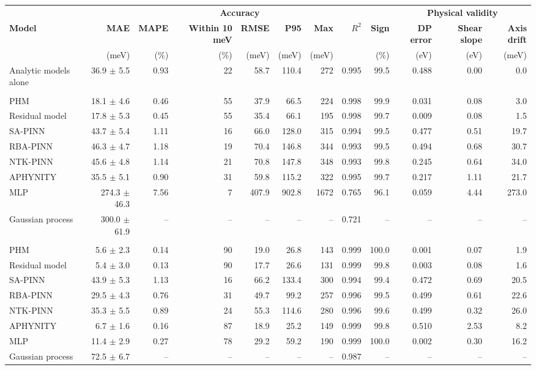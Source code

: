 \begin{tabular}{lrrrrrrrrrrr}
\toprule
 & \multicolumn{8}{c}{\textbf{Accuracy}} & \multicolumn{3}{c}{\textbf{Physical validity}} \\
\cmidrule(lr){2-9}\cmidrule(l){10-12}
\textbf{Model} & \textbf{MAE} & \textbf{MAPE} & \textbf{Within 10 meV} & \textbf{RMSE} & \textbf{P95} & \textbf{Max} & \textbf{$R^2$} & \textbf{Sign} & \textbf{DP error} & \textbf{Shear slope} & \textbf{Axis drift} \\
 & (meV) & (\%) & (\%) & (meV) & (meV) & (meV) & & (\%) & (eV) & (eV) & (meV) \\
\midrule
Analytic models alone & 36.9 $\pm$ 5.5 & 0.93 & 22 & 58.7 & 110.4 & 272 & 0.995 & 99.5 & 0.488 & 0.00 & 0.0 \\
\addlinespace
\multicolumn{12}{l}{\textit{5\% of the training states labeled (45 calculations)}} \\
PHM & 18.1 $\pm$ 4.6 & 0.46 & 55 & 37.9 & 66.5 & 224 & 0.998 & 99.9 & 0.031 & 0.08 & 3.0 \\
Residual model & 17.8 $\pm$ 5.3 & 0.45 & 55 & 35.4 & 66.1 & 195 & 0.998 & 99.7 & 0.009 & 0.08 & 1.5 \\
SA-PINN & 43.7 $\pm$ 5.4 & 1.11 & 16 & 66.0 & 128.0 & 315 & 0.994 & 99.5 & 0.477 & 0.51 & 19.7 \\
RBA-PINN & 46.3 $\pm$ 4.7 & 1.18 & 19 & 70.4 & 146.8 & 344 & 0.993 & 99.5 & 0.494 & 0.68 & 30.7 \\
NTK-PINN & 45.6 $\pm$ 4.8 & 1.14 & 21 & 70.8 & 147.8 & 348 & 0.993 & 99.8 & 0.245 & 0.64 & 34.0 \\
APHYNITY & 35.5 $\pm$ 5.1 & 0.90 & 31 & 59.8 & 115.2 & 322 & 0.995 & 99.7 & 0.217 & 1.11 & 21.7 \\
MLP & 274.3 $\pm$ 46.3 & 7.56 & 7 & 407.9 & 902.8 & 1672 & 0.765 & 96.1 & 0.059 & 4.44 & 273.0 \\
Gaussian process & 300.0 $\pm$ 61.9 & -- & -- & -- & -- & -- & 0.721 & -- & -- & -- & -- \\
\addlinespace
\multicolumn{12}{l}{\textit{100\% of the training states labeled (893--900 calculations)}} \\
PHM & 5.6 $\pm$ 2.3 & 0.14 & 90 & 19.0 & 26.8 & 143 & 0.999 & 100.0 & 0.001 & 0.07 & 1.9 \\
Residual model & 5.4 $\pm$ 3.0 & 0.13 & 90 & 17.7 & 26.6 & 131 & 0.999 & 99.8 & 0.003 & 0.08 & 1.6 \\
SA-PINN & 43.9 $\pm$ 5.3 & 1.13 & 16 & 66.2 & 133.4 & 300 & 0.994 & 99.4 & 0.472 & 0.69 & 20.5 \\
RBA-PINN & 29.5 $\pm$ 4.3 & 0.76 & 31 & 49.7 & 99.2 & 257 & 0.996 & 99.5 & 0.499 & 0.61 & 22.6 \\
NTK-PINN & 35.3 $\pm$ 5.5 & 0.89 & 24 & 55.3 & 114.6 & 280 & 0.996 & 99.6 & 0.499 & 0.32 & 26.0 \\
APHYNITY & 6.7 $\pm$ 1.6 & 0.16 & 87 & 18.9 & 25.2 & 149 & 0.999 & 99.8 & 0.510 & 2.53 & 8.2 \\
MLP & 11.4 $\pm$ 2.9 & 0.27 & 78 & 29.2 & 59.2 & 190 & 0.999 & 100.0 & 0.002 & 0.30 & 16.2 \\
Gaussian process & 72.5 $\pm$ 6.7 & -- & -- & -- & -- & -- & 0.987 & -- & -- & -- & -- \\
\bottomrule
\end{tabular}
